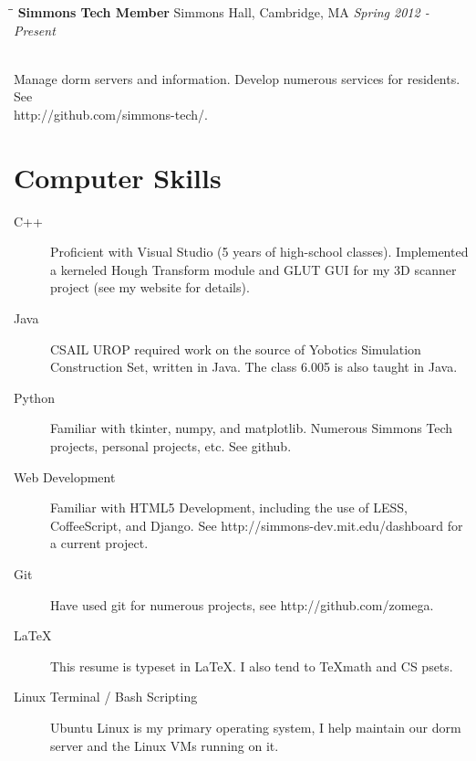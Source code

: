 \documentclass{res}
\begin{document}
\begin{resume}
			\begin{tabbing}
				\hspace{2.3in}\= \hspace{2.6in}\= \kill %
				{\bf Simmons Tech Member}	\>Simmons Hall, Cambridge, MA	\> \textit{Spring 2012 - Present}

				\\Manage dorm servers and information. Develop numerous services for residents. See\\http://github.com/simmons-tech/.

			\end{tabbing}

		\vspace{-20pt}
		\section{Computer Skills}

			\begin{description}

				\item[C++] Proficient with Visual Studio (5 years of high-school classes). Implemented a kerneled Hough Transform module  and GLUT GUI for my 3D scanner project (see my website for details).

				\item[Java] CSAIL UROP required work on the source of Yobotics Simulation Construction Set, written in Java. The class 6.005 is also taught in Java.

				\item[Python] Familiar with tkinter, numpy, and matplotlib. Numerous Simmons Tech projects, personal projects, etc. See github.

				\item[Web Development] Familiar with HTML5 Development, including the use of LESS, CoffeeScript, and Django. See http://simmons-dev.mit.edu/dashboard for a current project.

				\item[Git] Have used git for numerous projects, see http://github.com/zomega.

				\item[\LaTeX] This resume is typeset in \LaTeX. I also tend to \TeX \space math and CS psets.

				\item[Linux Terminal / Bash Scripting] Ubuntu Linux is my primary operating system, I help maintain our dorm server and the Linux VMs running on it.

			\end{description}
	\end{resume}
\end{document}
